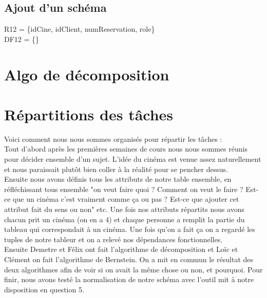 \documentclass[a4paper,sffamily,12pt]{article}
\begin{document}
				\vspace{0.5cm}
								
			\subsection{Ajout d'un schéma} 	

				\vspace{0.5cm}
											
				R12 = \{idCine, idClient, numReservation, role\} \\ DF12 = \{\} \\

				\vspace{0.5cm}

			\section{Algo de décomposition}

				\vspace{0.5cm}




				\vspace{0.5cm}
								
			\section{Répartitions des tâches}

				\vspace{0.5cm}

				\noindent Voici comment nous nous sommes organisés pour répartir les tâches : \\
				\indent Tout d'abord après les premières semaines de cours nous nous sommes réunis pour décider ensemble d'un sujet. L'idée du cinéma est venue assez naturellement et nous paraissait plutôt bien coller à la réalité pour se pencher dessus.\\
				\indent Ensuite nous avons définis tous les attributs de notre table ensemble, en réfléchissant tous ensemble "on veut faire quoi ? Comment on veut le faire ? Est-ce que un cinéma c'est vraiment comme ça ou pas ? Est-ce que ajouter cet attribut fait du sens ou non" etc. Une fois nos attributs répartits nous avons chacun prit un cinéma (on en a 4) et chaque personne a remplit la partie du tableau qui correspondait à un cinéma. Une fois qu'on a fait ça on a regardé les tuples de notre tableur et on a relevé nos dépendances fonctionnelles.\\
				\indent Ensuite Demetre et Félix ont fait l'algorithme de décomposition et Loïc et Clément on fait l'algorithme de Bernstein. On a mit en commun le résultat des deux algorithmes afin de voir si on avait la même chose ou non, et pourquoi. Pour finir, nous avons testé la normalisation de notre schéma avec l'outil mit à notre disposition en question 5.
\end{document}
